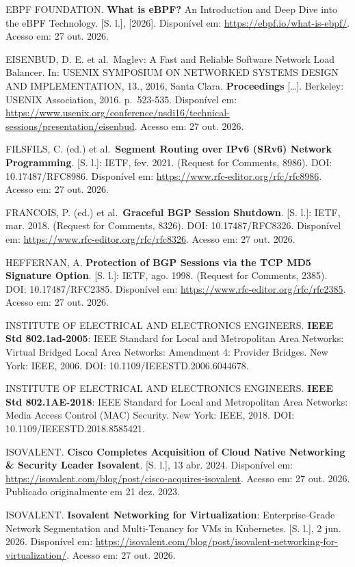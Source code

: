 \documentclass[12pt,openany,oneside,a4paper,chapter=TITLE,english,brazil]{abntex2}
\newenvironment{referenciasabnt}
  {\begin{flushleft}\SingleSpacing\setlength{\parindent}{0pt}\setlength{\parskip}{\baselineskip}}
  {\end{flushleft}}
\begin{document}
\begin{referenciasabnt}
EBPF FOUNDATION. \textbf{What is eBPF?} An Introduction and Deep Dive into the eBPF Technology. {[}S. l.{]}, {[}2026{]}. Disponível em: \url{https://ebpf.io/what-is-ebpf/}. Acesso em: 27 out. 2026.

EISENBUD, D. E. et al.~Maglev: A Fast and Reliable Software Network Load Balancer. In: USENIX SYMPOSIUM ON NETWORKED SYSTEMS DESIGN AND IMPLEMENTATION, 13., 2016, Santa Clara. \textbf{Proceedings} {[}\ldots{]}. Berkeley: USENIX Association, 2016. p.~523-535. Disponível em: \url{https://www.usenix.org/conference/nsdi16/technical-sessions/presentation/eisenbud}. Acesso em: 27 out. 2026.

FILSFILS, C. (ed.) et al.~\textbf{Segment Routing over IPv6 (SRv6) Network Programming}. {[}S. l.{]}: IETF, fev. 2021. (Request for Comments, 8986). DOI: 10.17487/RFC8986. Disponível em: \url{https://www.rfc-editor.org/rfc/rfc8986}. Acesso em: 27 out. 2026.

FRANCOIS, P. (ed.) et al.~\textbf{Graceful BGP Session Shutdown}. {[}S. l.{]}: IETF, mar. 2018. (Request for Comments, 8326). DOI: 10.17487/RFC8326. Disponível em: \url{https://www.rfc-editor.org/rfc/rfc8326}. Acesso em: 27 out. 2026.

HEFFERNAN, A. \textbf{Protection of BGP Sessions via the TCP MD5 Signature Option}. {[}S. l.{]}: IETF, ago. 1998. (Request for Comments, 2385). DOI: 10.17487/RFC2385. Disponível em: \url{https://www.rfc-editor.org/rfc/rfc2385}. Acesso em: 27 out. 2026.

INSTITUTE OF ELECTRICAL AND ELECTRONICS ENGINEERS. \textbf{IEEE Std 802.1ad-2005}: IEEE Standard for Local and Metropolitan Area Networks: Virtual Bridged Local Area Networks: Amendment 4: Provider Bridges. New York: IEEE, 2006. DOI: 10.1109/IEEESTD.2006.6044678.

INSTITUTE OF ELECTRICAL AND ELECTRONICS ENGINEERS. \textbf{IEEE Std 802.1AE-2018}: IEEE Standard for Local and Metropolitan Area Networks: Media Access Control (MAC) Security. New York: IEEE, 2018. DOI: 10.1109/IEEESTD.2018.8585421.

ISOVALENT. \textbf{Cisco Completes Acquisition of Cloud Native Networking \& Security Leader Isovalent}. {[}S. l.{]}, 13 abr. 2024. Disponível em: \url{https://isovalent.com/blog/post/cisco-acquires-isovalent}. Acesso em: 27 out. 2026. Publicado originalmente em 21 dez. 2023.

ISOVALENT. \textbf{Isovalent Networking for Virtualization}: Enterprise-Grade Network Segmentation and Multi-Tenancy for VMs in Kubernetes. {[}S. l.{]}, 2 jun. 2026. Disponível em: \url{https://isovalent.com/blog/post/isovalent-networking-for-virtualization/}. Acesso em: 27 out. 2026.


\end{referenciasabnt}
\end{document}
